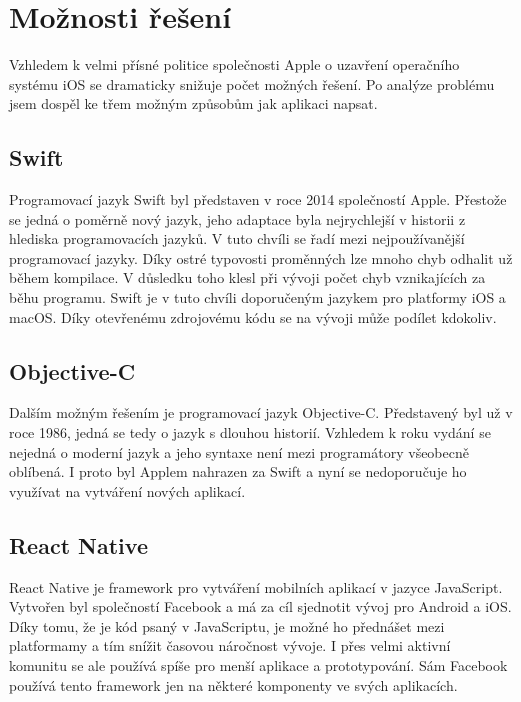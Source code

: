 \documentclass[czech]{article}
\begin{document}
\section{Možnosti řešení}

Vzhledem k velmi přísné politice společnosti Apple o uzavření operačního systému iOS se dramaticky snižuje počet možných řešení. Po analýze problému jsem dospěl ke třem možným způsobům jak aplikaci napsat.

\subsection{Swift}

Programovací jazyk Swift byl představen v roce 2014 společností Apple. Přestože se jedná o poměrně nový jazyk, jeho adaptace byla nejrychlejší v historii z hlediska programovacích jazyků. V tuto chvíli se řadí mezi nejpoužívanější programovací jazyky. Díky ostré typovosti proměnných lze mnoho chyb odhalit už během kompilace. V důsledku toho klesl při vývoji počet chyb vznikajících za běhu programu. Swift je v tuto chvíli doporučeným jazykem pro platformy iOS a macOS. Díky otevřenému zdrojovému kódu se na vývoji může podílet kdokoliv.

\subsection{Objective-C}

Dalším možným řešením je programovací jazyk Objective-C. Představený byl už v roce 1986, jedná se tedy o jazyk s dlouhou historií. Vzhledem k roku vydání se nejedná o moderní jazyk a jeho syntaxe není mezi programátory všeobecně oblíbená. I proto byl Applem nahrazen za Swift a nyní se nedoporučuje ho využívat na vytváření nových aplikací.

\subsection{React Native}

React Native je framework pro vytváření mobilních aplikací v jazyce JavaScript. Vytvořen byl společností Facebook a má za cíl sjednotit vývoj pro Android a iOS. Díky tomu, že je kód psaný v JavaScriptu, je možné ho přednášet mezi platformamy a tím snížit časovou náročnost vývoje. I přes velmi aktivní komunitu se ale používá spíše pro menší aplikace a prototypování. Sám Facebook používá tento framework jen na některé komponenty ve svých aplikacích.
\end{document}
